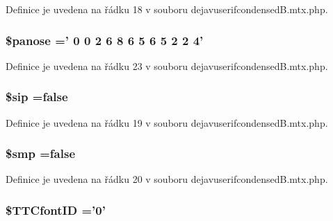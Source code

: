Definice je uvedena na řádku 18 v souboru dejavuserifcondensed\-B.\-mtx.\-php.

\hypertarget{dejavuserifcondensed_b_8mtx_8php_adec3b939f59252683592e3ad31a0cd72}{
\subsubsection[{\$panose}]{\setlength{\rightskip}{0pt plus 5cm}\$panose =' 0 0 2 6 8 6 5 6 5 2 2 4'}}\label{dejavuserifcondensed_b_8mtx_8php_adec3b939f59252683592e3ad31a0cd72}


Definice je uvedena na řádku 23 v souboru dejavuserifcondensed\-B.\-mtx.\-php.

\hypertarget{dejavuserifcondensed_b_8mtx_8php_ac07984f1157f4b24cd953085cfc7d40c}{
\subsubsection[{\$sip}]{\setlength{\rightskip}{0pt plus 5cm}\$sip ={\bf false}}}\label{dejavuserifcondensed_b_8mtx_8php_ac07984f1157f4b24cd953085cfc7d40c}


Definice je uvedena na řádku 19 v souboru dejavuserifcondensed\-B.\-mtx.\-php.

\hypertarget{dejavuserifcondensed_b_8mtx_8php_a7c2b1e4834c6dab47a78d2564d23935c}{
\subsubsection[{\$smp}]{\setlength{\rightskip}{0pt plus 5cm}\$smp ={\bf false}}}\label{dejavuserifcondensed_b_8mtx_8php_a7c2b1e4834c6dab47a78d2564d23935c}


Definice je uvedena na řádku 20 v souboru dejavuserifcondensed\-B.\-mtx.\-php.

\hypertarget{dejavuserifcondensed_b_8mtx_8php_ac3b78779654cec2ec1f552d784f1b5f0}{
\subsubsection[{\$\-T\-T\-Cfont\-I\-D}]{\setlength{\rightskip}{0pt plus 5cm}\$T\-T\-Cfont\-I\-D ='0'}}\label{dejavuserifcondensed_b_8mtx_8php_ac3b78779654cec2ec1f552d784f1b5f0}



